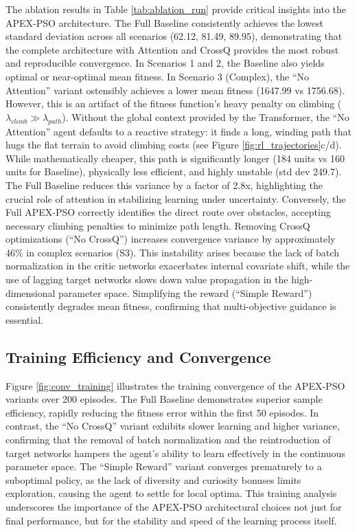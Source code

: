 \documentclass[fleqn,10pt]{wlscirep}
\begin{document}
The ablation results in Table \ref{tab:ablation_run} provide critical insights into the APEX-PSO architecture.
The Full Baseline consistently achieves the lowest standard deviation across all scenarios (62.12, 81.49, 89.95), demonstrating that the complete architecture with Attention and CrossQ provides the most robust and reproducible convergence.
In Scenarios 1 and 2, the Baseline also yields optimal or near-optimal mean fitness.
In Scenario 3 (Complex), the ``No Attention'' variant ostensibly achieves a lower mean fitness (1647.99 vs 1756.68). However, this is an artifact of the fitness function's heavy penalty on climbing ($\lambda_{climb} \gg \lambda_{path}$).
Without the global context provided by the Transformer, the ``No Attention'' agent defaults to a reactive strategy: it finds a long, winding path that hugs the flat terrain to avoid climbing costs (see Figure \ref{fig:rl_trajectories}c/d). While mathematically cheaper, this path is significantly longer (184 units vs 160 units for Baseline), physically less efficient, and highly unstable (std dev 249.7). The Full Baseline reduces this variance by a factor of 2.8x, highlighting the crucial role of attention in stabilizing learning under uncertainty.
Conversely, the Full APEX-PSO correctly identifies the direct route over obstacles, accepting necessary climbing penalties to minimize path length.
Removing CrossQ optimizations (``No CrossQ'') increases convergence variance by approximately 46\% in complex scenarios (S3). This instability arises because the lack of batch normalization in the critic networks exacerbates internal covariate shift, while the use of lagging target networks slows down value propagation in the high-dimensional parameter space. Simplifying the reward (``Simple Reward'') consistently degrades mean fitness, confirming that multi-objective guidance is essential.

\subsection*{Training Efficiency and Convergence}
Figure \ref{fig:conv_training} illustrates the training convergence of the APEX-PSO variants over 200 episodes.
The Full Baseline demonstrates superior sample efficiency, rapidly reducing the fitness error within the first 50 episodes.
In contrast, the ``No CrossQ'' variant exhibits slower learning and higher variance, confirming that the removal of batch normalization and the reintroduction of target networks hampers the agent's ability to learn effectively in the continuous parameter space.
The ``Simple Reward'' variant converges prematurely to a suboptimal policy, as the lack of diversity and curiosity bonuses limits exploration, causing the agent to settle for local optima.
This training analysis underscores the importance of the APEX-PSO architectural choices not just for final performance, but for the stability and speed of the learning process itself.
\end{document}
